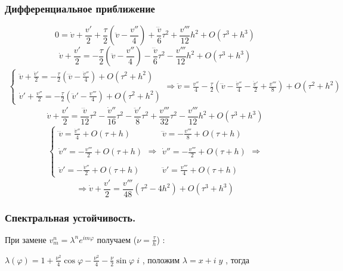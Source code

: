 \documentclass[a4paper,12pt]{article}
\begin{document}
\subsubsection{Дифференциальное приближение}
\[
0=\dot v + \frac{v'}{2} + \frac{\tau}{2}(\ddot v - \frac{v''}{4}) + \frac{\dddot v}{6}{\tau}^2 +\frac{v'''}{12}h^2+O(\tau^3+h^3)
\]
\[
\dot v + \frac{v'}{2} = -\frac{\tau}{2}(\ddot v - \frac{v''}{4}) - \frac{\dddot v}{6}{\tau}^2 -\frac{v'''}{12}h^2+O(\tau^3+h^3)
\]
\begin{align*}
\left\{
\begin{array}{l}
\ddot v+ \frac{\dot v'}{2}=-\frac{\tau}{2}(\dddot v - \frac{\dot v''}{4})+O(\tau^2+h^2)\\
\\
\dot v'+\frac{v''}{2}=-\frac{\tau}{2}(\ddot v'-\frac{v'''}{4})+O(\tau^2+h^2)
\end{array} \Rightarrow \ddot v=\frac{v''}{4}-\frac{\tau}{2}(\dddot v -\frac{\dot v''}{4}-\frac{\ddot v'}{2}+\frac{v'''}{8})+O(\tau^2+h^2)
\end{align*}
\[
\dot v+\frac{v'}{2}=\frac{\dddot v}{12}\tau^2-\frac{\dot v''}{16}\tau^2-\frac{\ddot v'}{8}\tau^2+\frac{v'''}{32} \tau^2-\frac{v'''}{12}h^2+O(\tau^3+h^3)
\]
\begin{align*}
\left\{
\begin{array}{l}
\dddot v=\frac{\dot v''}{4}+O(\tau+h)\\
\\
\dot v''=-\frac{v'''}{2}+O(\tau+h)\\
\\
\ddot v'=-\frac{\dot v''}{2}+O(\tau +h)
\end{array}\Rightarrow
\begin{array}{l}
\dddot v=-\frac{v'''}{8}+O(\tau+h)\\
\\
\dot v''=-\frac{v'''}{2}+O(\tau+h)\\
\\
\ddot v'=\frac{v'''}{4}+O(\tau +h)
\end{array} \Rightarrow
\end{align*}
\[
\Rightarrow    \dot v+\frac{v'}{2}=\frac{v'''}{48}(\tau^2-4h^2)+O(\tau^3+h^3)
\]
\subsubsection{Спектральная устойчивость.}
При замене $v^n_m=\lambda^n e^{i m \varphi}$ получаем ($\nu = \frac{\tau}h$) :

$\lambda(\varphi)=1+\frac{\nu^2}{4} \cos{\varphi}-\frac{\nu^2}{4} - \frac{\nu}{2} \sin{\varphi}\; i$ , положим $\lambda = x+i\; y$ , тогда 
\end{document}
